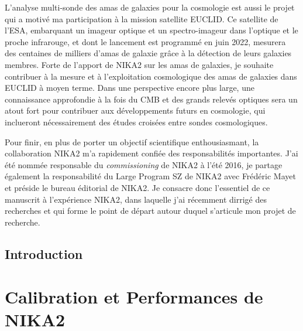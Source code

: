 \documentclass[a4paper, 12pt]{report}
\begin{document}
L'analyse multi-sonde des amas de galaxies pour la cosmologie est
aussi le projet qui a motivé ma participation à la mission satellite
EUCLID. Ce satellite de l'ESA, embarquant un imageur optique et un
spectro-imageur dans l'optique et le proche infrarouge, et dont le
lancement est programmé en juin 2022, mesurera des centaines de
milliers d'amas de galaxie grâce à la détection de leurs galaxies
membres. Forte de l'apport de NIKA2 sur les amas de galaxies, je
souhaite contribuer à la mesure et à l'exploitation cosmologique des
amas de galaxies dans EUCLID à moyen terme. Dans une perspective
encore plus large, une connaissance approfondie à la fois du CMB et
des grands relevés optiques sera un atout fort pour contribuer aux
développements futurs en cosmologie, qui inclueront nécessairement des
études croisées entre sondes cosmologiques.     

Pour finir, en plus de porter un objectif scientifique enthousiasmant,
la collaboration NIKA2 m'a rapidement confiée des responsabilités
importantes. J'ai été nommée responsable du \emph{commissioning} de
NIKA2 à l'été 2016, je partage également la responsabilité du Large
Program SZ de NIKA2 avec Frédéric Mayet et préside le bureau éditorial
de NIKA2. Je consacre donc l'essentiel de ce manuscrit à l'expérience
NIKA2, dans laquelle j'ai récemment dirrigé des recherches et qui
forme le point de départ autour duquel s'articule mon projet de
recherche.






\chapter*{Introduction}




%
%
%
%
%
%
%
%

%
%
%
%
%
%
%

\part{Calibration et Performances de NIKA2}
%
%   
%
\end{document}
